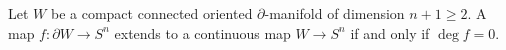 Let $W$ be a compact connected oriented $\partial$-manifold of dimension $n + 1 \geqslant 2$. A map $f: \partial W \to S^n$ extends to a continuous map $W \to S^n$ if and only if $\deg f = 0$.
